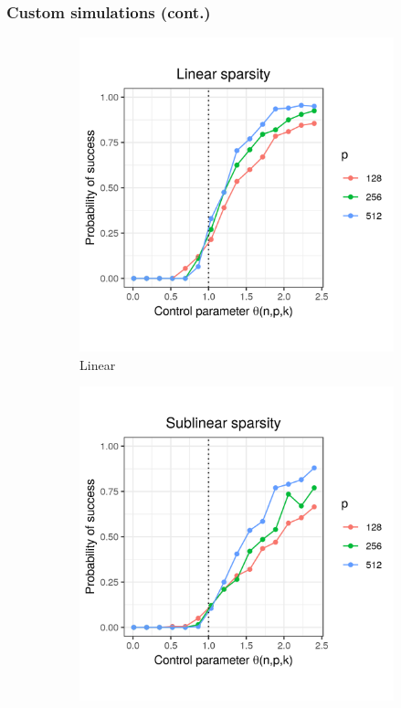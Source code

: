 \documentclass{beamer}
\begin{document}
\begin{frame}
\frametitle{Custom simulations (cont.)}

\begin{figure}[h]
  \centering
  \begin{subfigure}{0.32\textwidth}
    \includegraphics[width=0.9\linewidth]{uniform_linear_sparsity_alpha_075}
    \caption{Linear}
  \end{subfigure}
  \begin{subfigure}{0.32\textwidth}
    \includegraphics[width=0.9\linewidth]{uniform_sublinear_sparsity_alpha_075}

\end{subfigure}
\end{figure}
\end{frame}
\end{document}
